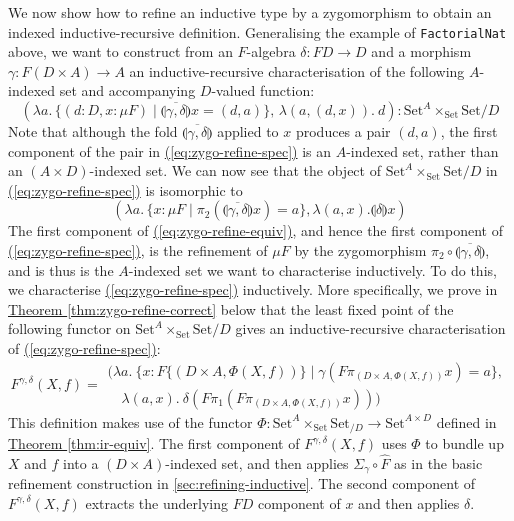 \documentclass{LMCS}
\newcommand{\sepbar}{\mathrel|}
\newcommand{\fold}[1]{\llparenthesis #1 \rrparenthesis}
\newcommand{\Set}{\mathrm{Set}}
\newcommand{\parenref}[1]{\hyperref[#1]{(\ref*{#1})}}
\newcommand{\thmref}[1]{\hyperref[#1]{Theorem \ref*{#1}}}
\begin{document}
We now show how to refine an inductive type by a zygomorphism to
obtain an indexed inductive-recursive definition. Generalising the
example of \texttt{FactorialNat} above, we want to construct from an
$F$-algebra $\delta : FD \to D$ and a morphism $\gamma : F(D \times A)
\to A$ an inductive-recursive characterisation of the following
$A$-indexed set and accompanying $D$-valued function:
\begin{equation}\label{eq:zygo-refine-spec}
  (\lambda a.\, \{ (d : D, x : \mu F) \sepbar
  \fold{\overline{\gamma,\delta}} x = (d,a) \},\, \lambda (a,(d,x)).\
  d) : \Set^A \times_{\Set} \Set/D
\end{equation}
Note that although the fold $\fold{\overline{\gamma,\delta}}$
applied to $x$ produces a pair $(d,a)$, the first component of the
pair in \parenref{eq:zygo-refine-spec} is an $A$-indexed set, rather
than an $(A \times D)$-indexed set. We can now see that the object of
$\Set^A \times_\Set \Set/D$ in \parenref{eq:zygo-refine-spec} is
isomorphic to 
\begin{equation}\label{eq:zygo-refine-equiv}
  (\lambda a.\, \{ x : \mu F \sepbar
  \pi_2(\fold{\overline{\gamma,\delta}} x) = a \}, \lambda (a,
  x). \fold{\delta}x) 
\end{equation}
The first component of \parenref{eq:zygo-refine-equiv}, and hence the
first component of \parenref{eq:zygo-refine-spec}, is the refinement
of $\mu F$ by the zygomorphism $\pi_2 \circ
\fold{\overline{\gamma,\delta}}$, and is thus is the $A$-indexed set
we want to characterise inductively. To do this, we
characterise \parenref{eq:zygo-refine-spec} inductively. More
specifically, we prove in \thmref{thm:zygo-refine-correct} below that
the least fixed point of the following functor on $\Set^A \times_\Set
\Set/D$ gives an inductive-recursive characterisation of
\parenref{eq:zygo-refine-spec}:
\begin{equation}\label{eq:zygo-refine-functor}
  F^{\gamma,\delta}(X,f) =
  \begin{array}{l}
    (\lambda a.\ \{ x : F\{(D \times A, \Phi(X,f))\} \sepbar \gamma(F\pi_{(D \times A, \Phi(X,f))} x) = a \}, \\
    \quad\lambda (a,x).\ \delta(F\pi_1(F\pi_{(D \times A, \Phi(X,f))} x)))
  \end{array}
\end{equation}
\noindent
This definition makes use of the functor $\Phi : \Set^A \times_\Set
\Set_{/D} \to \Set^{A \times D}$ defined in \thmref{thm:ir-equiv}. The
first component of $F^{\gamma,\delta}(X,f)$ uses $\Phi$ to bundle up
$X$ and $f$ into a $(D \times A)$-indexed set, and then applies
$\Sigma_\gamma \circ \hat{F}$ as in the basic refinement construction
in \autoref{sec:refining-inductive}. The second component of
$F^{\gamma,\delta}(X,f)$ extracts the underlying $FD$ component of $x$
and then applies $\delta$.
\end{document}
